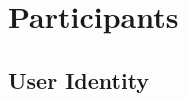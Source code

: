 
\section{Participants}
\label{sc:participantsandnodes}

\subsection{User Identity}
\label{ssc:accounts}


